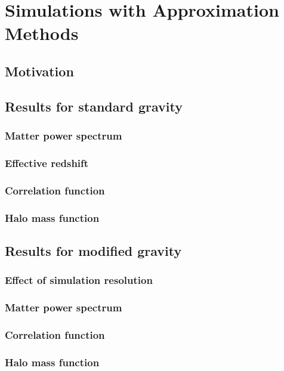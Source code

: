 \chapter{Simulations with Approximation Methods}

\section{Motivation}

\section{Results for standard gravity}


\subsection{Matter power spectrum}

\subsection{Effective redshift}

\subsection{Correlation function}

\subsection{Halo mass function}

\section{Results for modified gravity}

\subsection{Effect of simulation resolution}

\subsection{Matter power spectrum}

\subsection{Correlation function}

\subsection{Halo mass function}